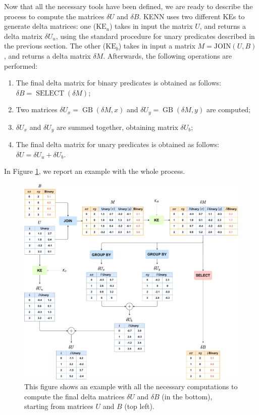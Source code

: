 Now that all the necessary tools have been defined, we are ready to describe the process to compute the matrices $\delta U$ and $\delta B$. KENN uses two different KEs to generate delta matrices: one ($\text{KE}_u$) takes in input the matrix $U$, and returns a delta matrix $\delta U_u$, using the standard procedure for unary predicates described in the previous section. The other ($\text{KE}_b$) takes in input a matrix $M=\text{JOIN}(U,B)$, and returns a delta matrix $\delta M$. Afterwards, the following operations are performed:
\begin{enumerate}
	\item The final delta matrix for binary predicates is obtained as follows: $\delta B = \operatorname{SELECT}(\delta M)$;
	\item Two matrices $\delta U_x = \operatorname{GB}(\delta M, x)$ and $\delta U_y = \operatorname{GB}(\delta M, y)$ are computed;
	\item $\delta U_x$ and $\delta U_y$ are summed together, obtaining matrix $\delta U_b$;
	\item The final delta matrix for unary predicates is obtained as follows: $\delta U = \delta U_u + \delta U_b$.
\end{enumerate}
In Figure \ref{fig:kenn_rel_global_scheme}, we report an example with the whole process.


\begin{figure}
	\centering
	\includegraphics[width=\linewidth]{figures/kenn_relational_global_chart.pdf}
	\caption{This figure shows an example with all the necessary computations to compute the final delta matrices $\delta U$ and $\delta B$ (in the bottom), starting from matrices $U$ and $B$ (top left).}
	\label{fig:kenn_rel_global_scheme}
\end{figure}
 
